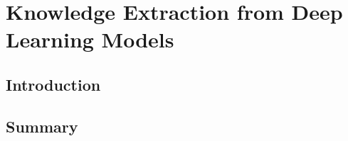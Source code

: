 \chapter{Knowledge Extraction from Deep Learning Models}
\label{chap:kbsextractiondl}
\section{Introduction}

\section{Summary}